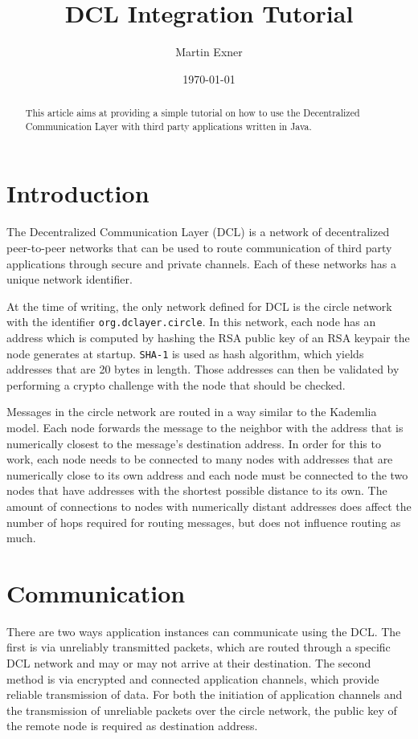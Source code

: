 \documentclass[a4paper,twoside,DIV=12,BCOR=1cm]{scrartcl}
\title{DCL Integration Tutorial}
\author{Martin Exner}
\date{\today}
\newcommand{\code}[1]{\texttt{#1}}
\begin{document}
\maketitle
\begin{multicols}{2}
\begin{abstract}
This article aims at providing a simple tutorial on how to use the
Decentralized Communication Layer with third party applications written
in Java.
\end{abstract}

\section*{Introduction}
The Decentralized Communication Layer (DCL) is a network of decentralized
peer-to-peer networks that can be used to route communication of third party
applications through secure and private channels. Each of these networks has a
unique network identifier.

At the time of writing, the only network defined for DCL is the circle network
with the identifier \code{org.dclayer.circle}. In this network, each node has
an address which is computed by hashing the RSA public key of an RSA keypair
the node generates at startup. \code{SHA-1} is used as hash algorithm, which
yields addresses that are 20 bytes in length. Those addresses can then be
validated by performing a crypto challenge with the node that should be checked.

Messages in the circle network are routed in a way similar to the Kademlia
model. Each node forwards the message to the neighbor with the address that is
numerically closest to the message's destination address. In order for this to
work, each node needs to be connected to many nodes with addresses that are
numerically close to its own address and each node must be connected to the two
nodes that have addresses with the shortest possible distance to its own. The
amount of connections to nodes with numerically distant addresses does affect
the number of hops required for routing messages, but does not influence routing
as much.

\section*{Communication}
There are two ways application instances can communicate using the DCL.
The first is via unreliably transmitted packets, which are routed through a
specific DCL network and may or may not arrive at their destination.
The second method is via encrypted and connected application channels, which
provide reliable transmission of data. For both the initiation of application
channels and the transmission of unreliable packets over the circle network, the
public key of the remote node is required as destination address.


\end{multicols}
\end{document}
